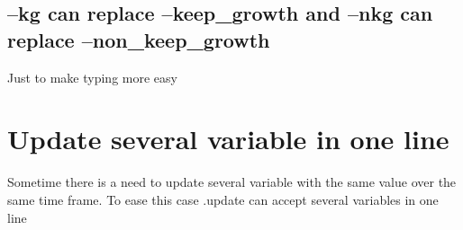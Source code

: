 \documentclass[letterpaper,10pt,english]{jupyterBook}
\begin{document}
\subsection{–kg can replace –keep\_growth and –nkg can replace –non\_keep\_growth}
\label{\detokenize{content/howto/update/model update:kg-can-replace-keep-growth-and-nkg-can-replace-non-keep-growth}}
\sphinxAtStartPar
Just to make typing more easy


\section{Update several variable in one line}
\label{\detokenize{content/howto/update/model update:update-several-variable-in-one-line}}
\sphinxAtStartPar
Sometime there is a need to update several variable with the same value over the same time frame. To ease this case .update can accept several variables in one line
\end{document}
